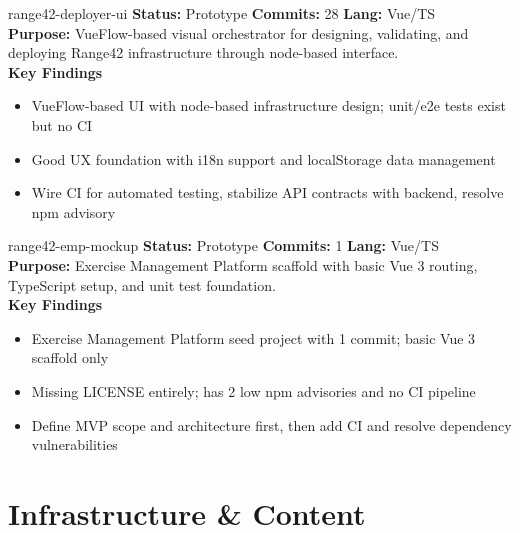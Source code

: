 \documentclass[aspectratio=169]{beamer}
\begin{document}
\begin{frame}{range42-deployer-ui \; \faDrawPolygon}
  \textbf{Status:} Prototype \hfill \textbf{Commits:} 28 \hfill \textbf{Lang:} Vue/TS\\[2mm]
  \textbf{Purpose:} VueFlow-based visual orchestrator for designing, validating, and deploying Range42 infrastructure through node-based interface.\\[2mm]
  \textbf{Key Findings}
  \begin{itemize}
    \item VueFlow-based UI with node-based infrastructure design; unit/e2e tests exist but no CI
    \item Good UX foundation with i18n support and localStorage data management
    \item Wire CI for automated testing, stabilize API contracts with backend, resolve npm advisory
  \end{itemize}
\end{frame}

\begin{frame}{range42-emp-mockup \; \faChalkboardTeacher}
  \textbf{Status:} Prototype \hfill \textbf{Commits:} 1 \hfill \textbf{Lang:} Vue/TS\\[2mm]
  \textbf{Purpose:} Exercise Management Platform scaffold with basic Vue 3 routing, TypeScript setup, and unit test foundation.\\[2mm]
  \textbf{Key Findings}
  \begin{itemize}
    \item Exercise Management Platform seed project with 1 commit; basic Vue 3 scaffold only
    \item Missing LICENSE entirely; has 2 low npm advisories and no CI pipeline
    \item Define MVP scope and architecture first, then add CI and resolve dependency vulnerabilities
  \end{itemize}
\end{frame}

\section{Infrastructure \& Content}
\end{document}
